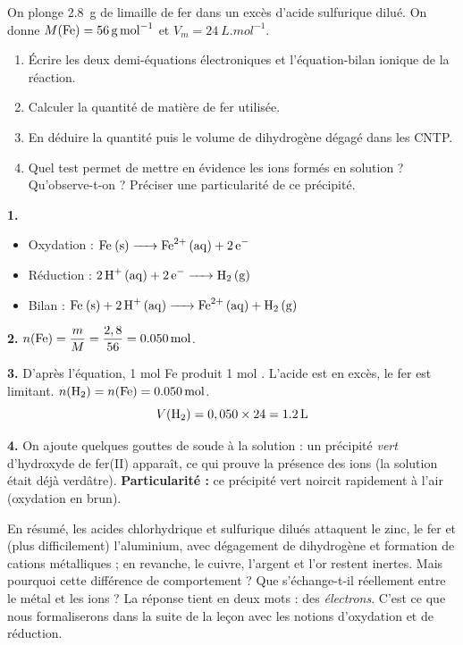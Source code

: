 \documentclass[11pt]{article}
\begin{document}
\begin{exercice}
On plonge \SI{2,8}{g} de limaille de fer dans un excès d'acide sulfurique dilué. On donne $M(\ce{Fe}) = \SI{56}{g.mol^{-1}}$ et $V_m = \SI{24}{L.mol^{-1}}$.
\begin{enumerate}
\item Écrire les deux demi-équations électroniques et l'équation-bilan ionique de la réaction.
\item Calculer la quantité de matière de fer utilisée.
\item En déduire la quantité puis le volume de dihydrogène dégagé dans les CNTP.
\item Quel test permet de mettre en évidence les ions formés en solution ? Qu'observe-t-on ? Préciser une particularité de ce précipité.
\end{enumerate}
\end{exercice}

\begin{corrige}[Exercice n° 1]
\textbf{1.} 
\begin{itemize}
\item Oxydation : $\ce{Fe (s) -> Fe^2+ (aq) + 2e-}$
\item Réduction : $\ce{2H+ (aq) + 2e- -> H2 (g)}$
\item Bilan : $\ce{Fe (s) + 2H+ (aq) -> Fe^2+ (aq) + H2 (g)}$
\end{itemize}

\textbf{2.} $n(\ce{Fe}) = \dfrac{m}{M} = \dfrac{2,8}{56} = \SI{0,050}{mol}$.

\textbf{3.} D'après l'équation, 1 mol Fe produit 1 mol . L'acide est en excès, le fer est limitant.
$n(\ce{H2}) = n(\ce{Fe}) = \SI{0,050}{mol}$.
\[ V(\ce{H2}) = 0,050 \times 24 = \SI{1,2}{L} \]

\textbf{4.} On ajoute quelques gouttes de soude à la solution : un précipité \emph{vert} d'hydroxyde de fer(II)  apparaît, ce qui prouve la présence des ions  (la solution était déjà verdâtre). \textbf{Particularité :} ce précipité vert noircit rapidement à l'air (oxydation en  brun).
\end{corrige}

En résumé, les acides chlorhydrique et sulfurique dilués attaquent le zinc, le fer et (plus difficilement) l'aluminium, avec dégagement de dihydrogène et formation de cations métalliques ; en revanche, le cuivre, l'argent et l'or restent inertes. Mais pourquoi cette différence de comportement ? Que s'échange-t-il réellement entre le métal et les ions  ? La réponse tient en deux mots : des \emph{électrons}. C'est ce que nous formaliserons dans la suite de la leçon avec les notions d'oxydation et de réduction.
\end{document}
